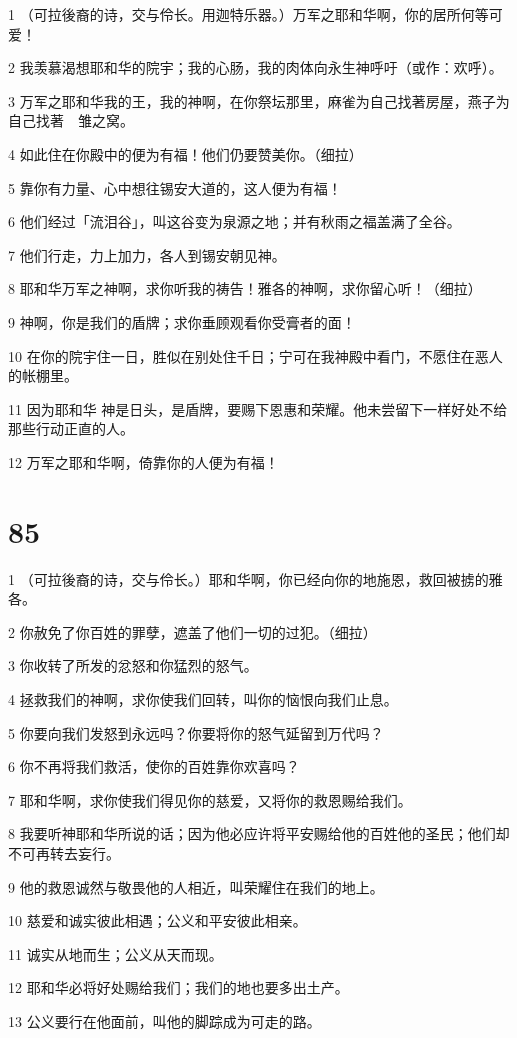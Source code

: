 \par 1 （可拉後裔的诗，交与伶长。用迦特乐器。）万军之耶和华啊，你的居所何等可爱！
\par 2 我羡慕渴想耶和华的院宇；我的心肠，我的肉体向永生神呼吁（或作：欢呼）。
\par 3 万军之耶和华我的王，我的神啊，在你祭坛那里，麻雀为自己找著房屋，燕子为自己找著　雏之窝。
\par 4 如此住在你殿中的便为有福！他们仍要赞美你。（细拉）
\par 5 靠你有力量、心中想往锡安大道的，这人便为有福！
\par 6 他们经过「流泪谷」，叫这谷变为泉源之地；并有秋雨之福盖满了全谷。
\par 7 他们行走，力上加力，各人到锡安朝见神。
\par 8 耶和华万军之神啊，求你听我的祷告！雅各的神啊，求你留心听！（细拉）
\par 9 神啊，你是我们的盾牌；求你垂顾观看你受膏者的面！
\par 10 在你的院宇住一日，胜似在别处住千日；宁可在我神殿中看门，不愿住在恶人的帐棚里。
\par 11 因为耶和华 神是日头，是盾牌，要赐下恩惠和荣耀。他未尝留下一样好处不给那些行动正直的人。
\par 12 万军之耶和华啊，倚靠你的人便为有福！

\chapter{85}

\par 1 （可拉後裔的诗，交与伶长。）耶和华啊，你已经向你的地施恩，救回被掳的雅各。
\par 2 你赦免了你百姓的罪孽，遮盖了他们一切的过犯。（细拉）
\par 3 你收转了所发的忿怒和你猛烈的怒气。
\par 4 拯救我们的神啊，求你使我们回转，叫你的恼恨向我们止息。
\par 5 你要向我们发怒到永远吗？你要将你的怒气延留到万代吗？
\par 6 你不再将我们救活，使你的百姓靠你欢喜吗？
\par 7 耶和华啊，求你使我们得见你的慈爱，又将你的救恩赐给我们。
\par 8 我要听神耶和华所说的话；因为他必应许将平安赐给他的百姓他的圣民；他们却不可再转去妄行。
\par 9 他的救恩诚然与敬畏他的人相近，叫荣耀住在我们的地上。
\par 10 慈爱和诚实彼此相遇；公义和平安彼此相亲。
\par 11 诚实从地而生；公义从天而现。
\par 12 耶和华必将好处赐给我们；我们的地也要多出土产。
\par 13 公义要行在他面前，叫他的脚踪成为可走的路。

